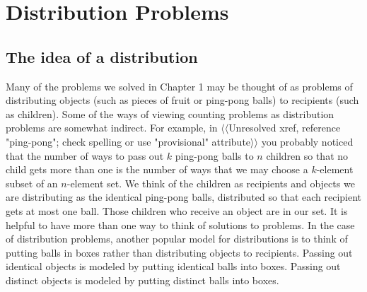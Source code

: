 \documentclass[10pt,]{book}
\theoremstyle{plain}
\theoremstyle{definition}
\numberwithin{equation}{chapter}
\begin{document}
\chapter[{Distribution Problems}]{Distribution Problems}\label{chapter-3}
\typeout{************************************************}
\typeout{************************************************}
\section[{The idea of a distribution}]{The idea of a distribution}\label{section-8}
\typeout{************************************************}
\typeout{************************************************}
Many of the problems we solved in Chapter 1 may be thought of as problems of distributing objects (such as pieces of fruit or ping-pong balls) to recipients (such as children). Some of the ways of viewing counting problems as distribution problems are somewhat indirect. For example, in {$\langle\langle$Unresolved xref, reference "ping-pong"; check spelling or use "provisional" attribute$\rangle\rangle$} you probably noticed that the number of ways to pass out \(k\) ping-pong balls to \(n\) children so that no child gets more than one is the number of ways that we may choose a \(k\)-element subset of an \(n\)-element set. We think of the children as recipients and objects we are distributing as the identical ping-pong balls, distributed so that each recipient gets at most one ball. Those children who receive an object are in our set. It is helpful to have more than one way to think of solutions to problems. In the case of distribution problems, another popular model for distributions is to think of putting balls in boxes rather than distributing objects to recipients. Passing out identical objects is modeled by putting identical balls into boxes. Passing out distinct objects is modeled by putting distinct balls into boxes.%
\typeout{************************************************}
\typeout{************************************************}
\end{document}
